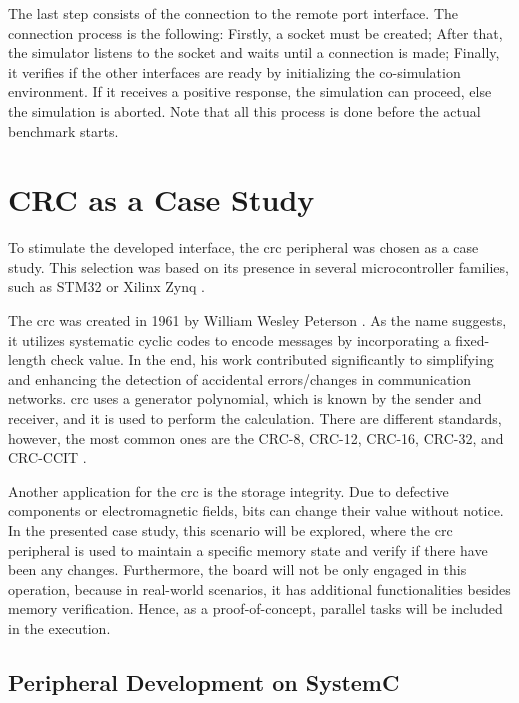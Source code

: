The last step consists of the connection to the remote port interface. The connection process is the following: Firstly, a socket must be created; 
After that, the simulator listens to the socket and waits until a connection is made; Finally, it verifies if the other interfaces are ready 
by initializing the co-simulation environment. If it receives a positive response, the simulation can proceed, else the simulation is aborted. 
Note that all this process is done before the actual benchmark starts. 

\section{CRC as a Case Study}

To stimulate the developed interface, the \gls{crc} peripheral was chosen as a case study.
This selection was based on its presence in several microcontroller families, such as STM32 \cite{referenceManualRM0385} or Xilinx Zynq \cite{xilinx2014zynq}.

The \gls{crc} was created in 1961 by William Wesley Peterson \cite{peterson1961cyclic}. As the name suggests, 
it utilizes systematic cyclic codes to encode messages by incorporating a fixed-length check value. In the end, his work
contributed significantly to simplifying and enhancing the detection of accidental errors/changes in communication 
networks. \gls{crc} uses a generator polynomial, which is known by the sender and receiver, and it is used to 
perform the calculation. There are different standards, however, the most common ones are the CRC-8, CRC-12, CRC-16, 
CRC-32, and CRC-CCIT \cite{borrelli2001ieee}.

Another application for the \gls{crc} is the storage integrity. Due to defective components or electromagnetic fields,
bits can change their value without notice. In the presented case study, this scenario will be explored, where 
the \gls{crc} peripheral is used to maintain a specific memory state and verify if there have been any changes. 
Furthermore, the board will not be only engaged in this operation, because in real-world scenarios, it has additional functionalities 
besides memory verification. Hence, as a proof-of-concept, parallel tasks will be included in the execution.

\subsection{Peripheral Development on SystemC}

